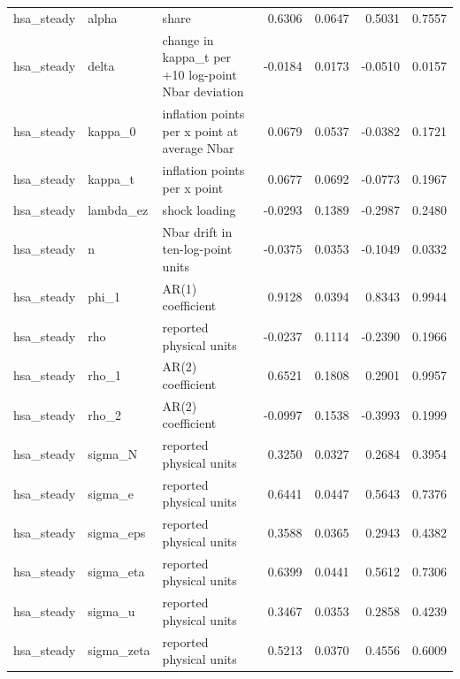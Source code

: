 \begin{tabular}{lllrrrr}
hsa\_steady & alpha & share & 0.6306 & 0.0647 & 0.5031 & 0.7557 \\
hsa\_steady & delta & change in kappa\_t per +10 log-point Nbar deviation & -0.0184 & 0.0173 & -0.0510 & 0.0157 \\
hsa\_steady & kappa\_0 & inflation points per x point at average Nbar & 0.0679 & 0.0537 & -0.0382 & 0.1721 \\
hsa\_steady & kappa\_t & inflation points per x point & 0.0677 & 0.0692 & -0.0773 & 0.1967 \\
hsa\_steady & lambda\_ez & shock loading & -0.0293 & 0.1389 & -0.2987 & 0.2480 \\
hsa\_steady & n & Nbar drift in ten-log-point units & -0.0375 & 0.0353 & -0.1049 & 0.0332 \\
hsa\_steady & phi\_1 & AR(1) coefficient & 0.9128 & 0.0394 & 0.8343 & 0.9944 \\
hsa\_steady & rho & reported physical units & -0.0237 & 0.1114 & -0.2390 & 0.1966 \\
hsa\_steady & rho\_1 & AR(2) coefficient & 0.6521 & 0.1808 & 0.2901 & 0.9957 \\
hsa\_steady & rho\_2 & AR(2) coefficient & -0.0997 & 0.1538 & -0.3993 & 0.1999 \\
hsa\_steady & sigma\_N & reported physical units & 0.3250 & 0.0327 & 0.2684 & 0.3954 \\
hsa\_steady & sigma\_e & reported physical units & 0.6441 & 0.0447 & 0.5643 & 0.7376 \\
hsa\_steady & sigma\_eps & reported physical units & 0.3588 & 0.0365 & 0.2943 & 0.4382 \\
hsa\_steady & sigma\_eta & reported physical units & 0.6399 & 0.0441 & 0.5612 & 0.7306 \\
hsa\_steady & sigma\_u & reported physical units & 0.3467 & 0.0353 & 0.2858 & 0.4239 \\
hsa\_steady & sigma\_zeta & reported physical units & 0.5213 & 0.0370 & 0.4556 & 0.6009 \\
\bottomrule
\end{tabular}

